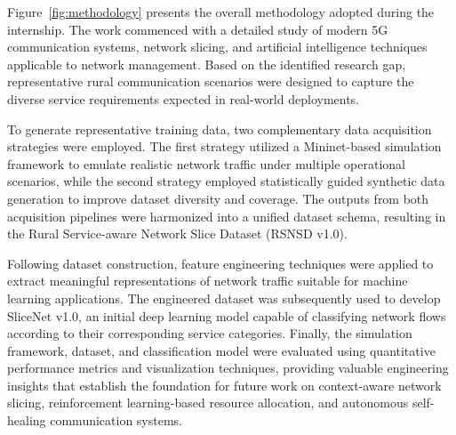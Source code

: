 \documentclass[12pt,a4paper]{report}
\begin{document}

	
	Figure~\ref{fig:methodology} presents the overall methodology adopted during the internship. The work commenced with a detailed study of modern 5G communication systems, network slicing, and artificial intelligence techniques applicable to network management. Based on the identified research gap, representative rural communication scenarios were designed to capture the diverse service requirements expected in real-world deployments.
	
	To generate representative training data, two complementary data acquisition strategies were employed. The first strategy utilized a Mininet-based simulation framework to emulate realistic network traffic under multiple operational scenarios, while the second strategy employed statistically guided synthetic data generation to improve dataset diversity and coverage. The outputs from both acquisition pipelines were harmonized into a unified dataset schema, resulting in the Rural Service-aware Network Slice Dataset (RSNSD v1.0).
	
	Following dataset construction, feature engineering techniques were applied to extract meaningful representations of network traffic suitable for machine learning applications. The engineered dataset was subsequently used to develop SliceNet v1.0, an initial deep learning model capable of classifying network flows according to their corresponding service categories. Finally, the simulation framework, dataset, and classification model were evaluated using quantitative performance metrics and visualization techniques, providing valuable engineering insights that establish the foundation for future work on context-aware network slicing, reinforcement learning-based resource allocation, and autonomous self-healing communication systems.
	
\end{document}
